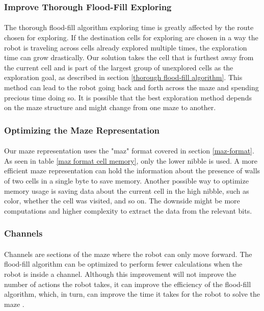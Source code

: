 \documentclass[12pt]{article}
\begin{document}
\subsubsection{Improve Thorough Flood-Fill Exploring}
\paragraph{}
The thorough flood-fill algorithm exploring time is greatly affected by the route chosen for exploring.
If the destination \gls{cell}s for exploring are chosen in a way the robot is traveling across \gls{cell}s already explored multiple times, the exploration time can grow drastically.
Our solution takes the \gls{cell} that is furthest away from the current \gls{cell} and is part of the largest group of unexplored \gls{cell}s as the exploration goal, as described in section \ref{thorough flood-fill algorithm}.
This method can lead to the robot going back and forth across the \gls{maze} and spending precious time doing so.
It is possible that the best exploration method depends on the \gls{maze} structure and might change from one \gls{maze} to another.

\subsubsection{Optimizing the Maze Representation}
\paragraph{}
Our \gls{maze} representation uses the "maz" format covered in section \ref{maz-format}.
As seen in table \ref{maz format cell memory}, only the lower \gls{nibble} is used.
A more efficient \gls{maze} representation can hold the information about the presence of walls of two \gls{cell}s in a single byte to save memory.
Another possible way to optimize memory usage is saving data about the current \gls{cell} in the high \gls{nibble}, such as color, whether the \gls{cell} was visited, and so on.
The downside might be more computations and higher complexity to extract the data from the relevant bits.

\subsubsection{Channels}
\paragraph{}
Channels are sections of the \gls{maze} where the robot can only move forward.
The flood-fill algorithm can be optimized to perform fewer calculations when the robot is inside a channel.
Although this improvement will not improve the number of actions the robot takes, it can improve the efficiency of the flood-fill algorithm, which, in turn, can improve the time it takes for the robot to solve the \gls{maze} \cite{5591159}.
\end{document}
